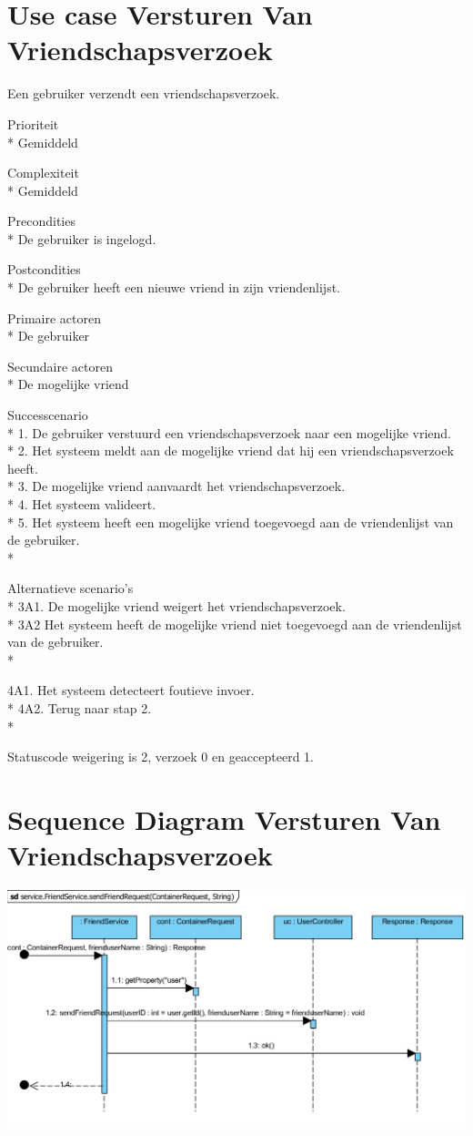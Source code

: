 \documentclass[pdftex,a4paper,12pt,twoside]{report}
\begin{document}
\section{Use case Versturen Van Vriendschapsverzoek}
Een gebruiker verzendt een vriendschapsverzoek.

Prioriteit\\*
Gemiddeld

Complexiteit\\*
Gemiddeld

Precondities \\*
De gebruiker is ingelogd.

Postcondities \\*
De gebruiker heeft een nieuwe vriend in zijn vriendenlijst.

Primaire actoren \\*
De gebruiker

Secundaire actoren \\*
De mogelijke vriend

Successcenario\\*
1. De gebruiker verstuurd een vriendschapsverzoek naar een mogelijke vriend.\\*
2. Het systeem meldt aan de mogelijke vriend dat hij een vriendschapsverzoek heeft.\\*
3. De mogelijke vriend aanvaardt het vriendschapsverzoek.\\*
4. Het systeem valideert.\\*
5. Het systeem heeft een mogelijke vriend toegevoegd aan de vriendenlijst van de gebruiker.\\*

Alternatieve scenario’s\\*
3A1. De mogelijke vriend weigert het vriendschapsverzoek.\\*
3A2 Het systeem heeft de mogelijke vriend niet toegevoegd aan de vriendenlijst van de gebruiker.\\*

4A1. Het systeem detecteert foutieve invoer.\\*
4A2. Terug naar stap 2.\\*

Statuscode weigering is 2, verzoek 0 en geaccepteerd 1.
\section{Sequence Diagram Versturen Van Vriendschapsverzoek}
\includegraphics[width=\textwidth]{images/sendfriendrequest.png}
\end{document}

